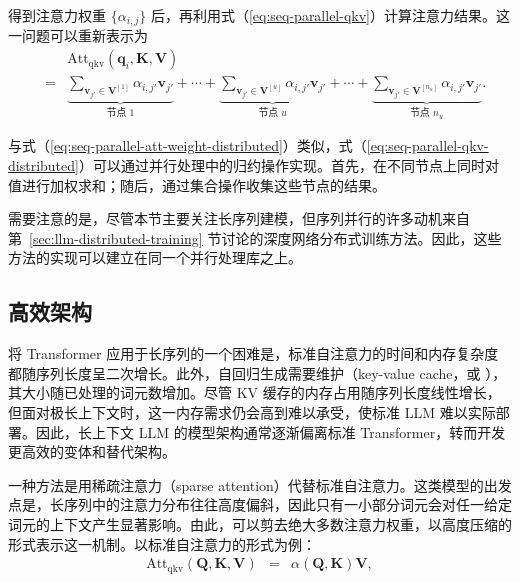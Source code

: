 得到注意力权重 $\{\alpha_{i,j}\}$ 后，再利用式（\ref{eq:seq-parallel-qkv}）计算注意力结果。这一问题可以重新表示为
\begin{eqnarray}
&   & \mathrm{Att}_{\mathrm{qkv}}(\mathbf{q}_i,\mathbf{K},\mathbf{V}) \nonumber \\
& = & \underbrace{\sum_{\mathbf{v}_{j'} \in \mathbf{V}^{[1]}} \alpha_{i,j'} \mathbf{v}_{j'} }_{\textrm{节点 $1$}} + \cdots + \underbrace{\sum_{\mathbf{v}_{j'} \in \mathbf{V}^{[u]}} \alpha_{i,j'} \mathbf{v}_{j'} }_{\textrm{节点 $u$}} + \cdots + \underbrace{\sum_{\mathbf{v}_{j'} \in \mathbf{V}^{[n_u]}} \alpha_{i,j'} \mathbf{v}_{j'} }_{\textrm{节点 $n_u$}} \label{eq:seq-parallel-qkv-distributed}.
\end{eqnarray}

与式（\ref{eq:seq-parallel-att-weight-distributed}）类似，式（\ref{eq:seq-parallel-qkv-distributed}）可以通过并行处理中的归约操作实现。首先，在不同节点上同时对值进行加权求和；随后，通过集合操作收集这些节点的结果。

需要注意的是，尽管本节主要关注长序列建模，但序列并行的许多动机来自第~\ref{sec:llm-distributed-training} 节讨论的深度网络分布式训练方法。因此，这些方法的实现可以建立在同一个并行处理库之上。

\subsection{高效架构}

\noindent 将 Transformer 应用于长序列的一个困难是，标准自注意力的时间和内存复杂度都随序列长度呈二次增长。此外，自回归生成需要维护（key-value cache，或 ），其大小随已处理的词元数增加。尽管 KV 缓存的内存占用随序列长度线性增长，但面对极长上下文时，这一内存需求仍会高到难以承受，使标准 LLM 难以实际部署。因此，长上下文 LLM 的模型架构通常逐渐偏离标准 Transformer，转而开发更高效的变体和替代架构。

一种方法是用稀疏注意力（sparse attention）代替标准自注意力。这类模型的出发点是，长序列中的注意力分布往往高度偏斜，因此只有一小部分词元会对任一给定词元的上下文产生显著影响。由此，可以剪去绝大多数注意力权重，以高度压缩的形式表示这一机制。以标准自注意力的形式为例：
\begin{eqnarray}
\mathrm{Att}_{\mathrm{qkv}}(\mathbf{Q},\mathbf{K},\mathbf{V}) & = & \alpha(\mathbf{Q},\mathbf{K}) \mathbf{V} \label{eq:qkv-attention-attention-weights},
\end{eqnarray}

